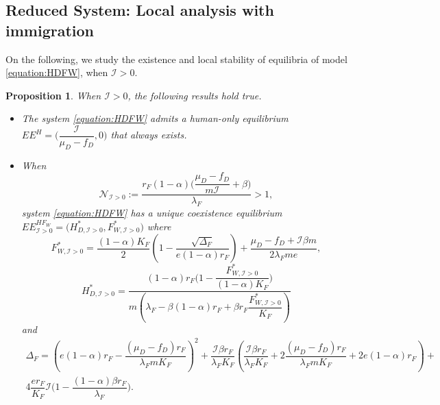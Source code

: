 \documentclass{article}
\newcommand{\lfw}{\lambda_{F}}
\newcommand{\lfw}{\lambda_{F}}
\newcommand{\cI}{\mathcal{I}}
\newtheorem{prop}[theorem]{Proposition}
\theoremstyle{definition}
\theoremstyle{remark}
\newtheorem{remark}[theorem]{Remark}
\begin{document}
\subsection{Reduced System: Local analysis with immigration}
On the following, we study the existence and local stability of equilibria of model \eqref{equation:HDFW}, when $\cI > 0$.

\begin{prop}\label{prop:eq, cI>0}
When $\cI > 0$, the following results hold true.
\begin{itemize}
\item The system \eqref{equation:HDFW} admits a human-only equilibrium $EE^{H} =\Big(\dfrac{\cI}{\mu_D - f_D}, 0 \Big)$ that always exists.
\item When 
$$ \mathcal{N}_{\cI >0} :=  \dfrac{r_F(1-\alpha)\Big({\dfrac{\mu_D - f_D}{m\cI}+\beta\Big)}}{\lfw}  > 1,$$
system \eqref{equation:HDFW} has a unique coexistence equilibrium $EE^{HF_W}_{\cI > 0} = \Big(H^*_{D, \cI > 0}, F^*_{W, \cI > 0}\Big)$
where
$$F^*_{W, \cI > 0} = \dfrac{(1-\alpha)K_F}{2}\left(1 - \dfrac{\sqrt{\Delta_F}}{e(1-\alpha)r_F}\right) + \dfrac{\mu_D - f_D + \cI \beta m}{2\lfw m e},$$
$$
H^*_{D, \cI > 0} = \dfrac{(1-\alpha)r_F\Big(1 - \dfrac{F^*_{W, \cI > 0}}{(1-\alpha)K_F} \Big)}{m\left(\lfw - \beta (1-\alpha) r_F + \beta r_F  \dfrac{F^*_{W, \cI > 0}}{K_F}\right)}
$$
and
\begin{multline*}
\Delta_F = \left(e(1-\alpha)r_F - \dfrac{(\mu_D - f_D) r_F}{\lfw m K_F}\right)^2 + \dfrac{\cI \beta r_F}{\lfw K_F} \left(\dfrac{\cI \beta r_F}{\lfw K_F} + 2\dfrac{(\mu_D - f_D) r_F}{\lfw m K_F} + 2e(1-\alpha)r_F \right) + \\ 4\dfrac{er_F}{K_F}  \cI\Big(1 - \dfrac{(1-\alpha)\beta r_F}{\lfw} \Big).
\end{multline*}
\end{itemize} 
\end{prop}
\end{document}
